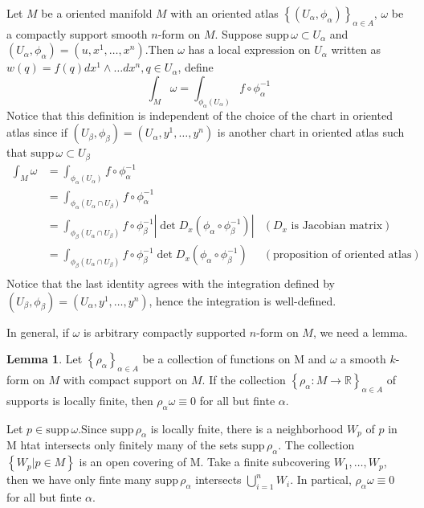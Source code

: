 \documentclass[b5paper,12pt]{article}
\newenvironment{prooff}{{\noindent\it\textcolor{black}{Proof}:}\quad}{\par}
\newcommand{\bbrace}[1]{\left\{ #1 \right\} }
\newcommand{\bb}[1]{\mathbb{#1}}
\theoremstyle{definition}
\newtheorem{lem}[defn]{Lemma}
\begin{document}
Let $M$ be a oriented manifold $M$ with an oriented atlas $\bbrace{(U_{\alpha},\phi_{\alpha})}_{\alpha\in A}$, $\omega$ be a compactly support smooth $n$-form on $M$.
Suppose $\text{supp}\,\omega\subset U_{\alpha}$ and $(U_{\alpha},\phi_{\alpha})=(u,x^1,\dots,x^n)$.Then $\omega$ has a local expression on $U_{\alpha}$ written as $w(q)=f(q)dx^1\wedge \dots dx^n, q\in U_{\alpha}$, define
\begin{equation}
    \int_{M}\omega=\int_{\phi_{\alpha}(U_{\alpha})}f\circ\phi_{\alpha}^{-1}
\end{equation}
Notice that this definition is independent of the choice of the chart in oriented atlas since if $(U_{\beta},\phi_{\beta})=(U_{\alpha},y^1,\dots,y^n)$ is another chart in oriented atlas such that
$\text{supp}\,\omega\subset U_{\beta}$
\begin{align*}
    \int_{M}\omega & =\int_{\phi_{\alpha}(U_{\alpha})}f\circ\phi_{\alpha}^{-1}                                                             &                                        \\
                   & =\int_{\phi_{\alpha}(U_{\alpha}\cap U_{\beta})}f\circ\phi_{\alpha}^{-1}                                               &                                        \\
                   & =\int_{\phi_{\beta} (U_{\alpha}\cap U_{\beta})}f\circ\phi_{\beta}^{-1}|\det D_x(\phi_{\alpha}\circ\phi_{\beta}^{-1})| & (\text{$D_x$ is Jacobian matrix})      \\
                   & =\int_{\phi_{\beta} (U_{\alpha}\cap U_{\beta})}f\circ\phi_{\beta}^{-1} \det D_x(\phi_{\alpha}\circ\phi_{\beta}^{-1})  & (\text{proposition of oriented atlas}) \\
\end{align*}
Notice that the last identity agrees with the integration defined by $(U_{\beta},\phi_{\beta})=(U_{\alpha},y^1,\dots,y^n)$, hence the integration is well-defined.

In general, if $\omega$ is arbitrary compactly supported $n$-form on $M$, we need a lemma.
\begin{lem}
    Let $\bbrace{\rho_{\alpha}}_{\alpha\in A}$ be a collection of functions on M and $\omega$ a smooth $k$-form on $M$ with compact support on $M$. If the collection $\bbrace{\rho_{\alpha}:M\rightarrow\bb{R}}_{\alpha\in A}$
    of supports is locally finite, then $\rho_{\alpha}\omega\equiv 0$ for all but finte $\alpha$.
\end{lem}
\begin{prooff}
    Let $p\in \text{supp}\,\omega$.Since $\text{supp}\,\rho_{\alpha}$ is locally fnite, there is a neighborhood $W_p$ of $p$ in M htat intersects only finitely many of the sets $\text{supp}\,\rho_{\alpha}$. The collection
    $\bbrace{W_p|p\in M}$ is an open covering of M. Take a finite subcovering $W_1,\dots,W_p$, then we have only finte many $\text{supp}\,\rho_{\alpha}$ intersects $\bigcup_{i=1}^n W_i$. In partical, $\rho_{\alpha}\omega\equiv 0$ for all but finte $\alpha$.
\end{prooff}
\vskip 0.75cm
\end{document}
